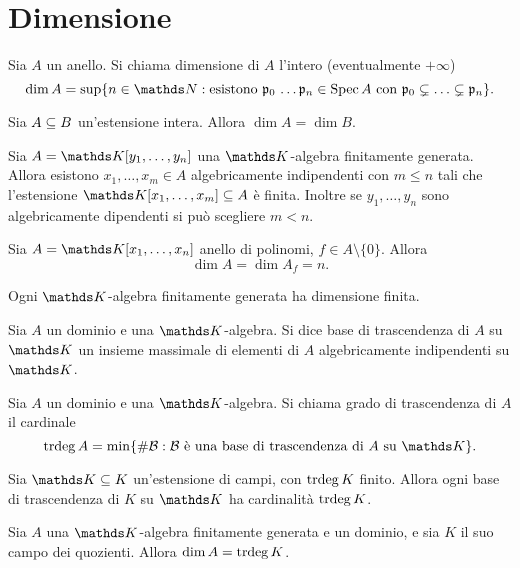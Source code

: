 \section{Dimensione}
\begin{definition}
Sia $A$ un anello. Si chiama dimensione di $A$ l'intero (eventualmente $+\infty$)
$$
\dim A=\sup\{n\in\NN:\text{esistono $\pp_0\,\ldots\pp_n\in\Spec A$ con $\pp_0\subsn\ldots\subsn\pp_n$}\}.
$$
\end{definition}
\begin{proposition}
Sia $A\subseteq B$ un'estensione intera. Allora $\dim A=\dim B$.
\end{proposition}
\begin{proposition}
Sia $A=\KK[y_1,\ldots,y_n]$ una $\KK$-algebra finitamente generata. Allora esistono $x_1,\ldots,x_m\in A$ algebricamente indipendenti con $m\le n$ tali che l'estensione $\KK[x_1,\ldots,x_m]\subs A$ è finita. Inoltre se $y_1,\ldots,y_n$ sono algebricamente dipendenti si può scegliere $m<n$.
\end{proposition}
\begin{proposition}
Sia $A=\KK[x_1,\ldots,x_n]$ anello di polinomi, $f\in A\setminus\{0\}$. Allora
$$
\dim A=\dim A_f=n.
$$
\end{proposition}
\begin{corollary}
Ogni $\KK$-algebra finitamente generata ha dimensione finita.
\end{corollary}
\begin{definition}
Sia $A$ un dominio e una $\KK$-algebra. Si dice base di trascendenza di $A$ su $\KK$ un insieme massimale di elementi di $A$ algebricamente indipendenti su $\KK$.
\end{definition}
\begin{definition}
Sia $A$ un dominio e una $\KK$-algebra. Si chiama grado di trascendenza di $A$ il cardinale
$$
\trdeg A=\min\{\#\mathcal{B}:\text{$\mathcal{B}$ è una base di trascendenza di $A$ su $\KK$}\}.
$$
\end{definition}
\begin{proposition}
Sia $\KK\subs K$ un'estensione di campi, con $\operatorname{trdeg} K$ finito. Allora ogni base di trascendenza di $K$ su $\KK$ ha cardinalità $\operatorname{trdeg} K$.
\end{proposition}
\begin{corollary}
Sia $A$ una $\KK$-algebra finitamente generata e un dominio, e sia $K$ il suo campo dei quozienti. Allora $\dim A=\operatorname{trdeg} K$.
\end{corollary}



